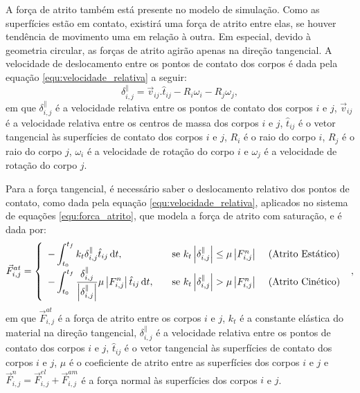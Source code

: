     A força de atrito também está presente no modelo de simulação. Como as superfícies estão em contato, existirá uma força de atrito entre elas, se houver tendência de movimento uma em relação à outra. Em especial, devido à geometria circular, as forças de atrito agirão apenas na direção tangencial. A velocidade de deslocamento entre os pontos de contato dos corpos é dada pela equação \ref{equ:velocidade_relativa} a seguir:
\begin{equation}
  \label{equ:velocidade_relativa}
  \delta_{i,j}^{\parallel} = \vec{v}_{ij}.\hat{t}_{ij} - R_{i}\omega_{i} - R_{j}\omega_{j},
\end{equation}
em que $\delta_{i,j}^{\parallel}$ é a velocidade relativa entre os pontos de contato dos corpos $i$ e $j$, $\vec{v}_{ij}$ é a velocidade relativa entre os centros de massa dos corpos $i$ e $j$, $\hat{t}_{ij}$ é o vetor tangencial às superfícies de contato dos corpos $i$ e $j$, $R_{i}$ é o raio do corpo $i$, $R_{j}$ é o raio do corpo $j$, $\omega_{i}$ é a velocidade de rotação do corpo $i$ e $\omega_{j}$ é a velocidade de rotação do corpo $j$.

    Para a força tangencial, é necessário saber o deslocamento relativo dos pontos de contato, como dada pela equação \ref{equ:velocidade_relativa}, aplicados no sistema de equações \ref{equ:forca_atrito}, que modela a força de atrito com saturação, e é dada por:
\begin{equation}
    \label{equ:forca_atrito}
    \vec{F}_{i,j}^{at} = \left\{
    \begin{array}{l l l}
        \displaystyle -\int_{t_{0}}^{t_{f}} k_{t} \delta_{i,j}^{\parallel} \hat{t}_{ij}\, \mathrm{d} t, & \quad \textrm{se } k_{t} \left| \delta_{i,j}^{\parallel} \right| \leq \mu \left|F_{i,j}^{n}\right| & \textrm{ (Atrito Estático)} \\
        \displaystyle -\int_{t_{0}}^{t_{f}} \frac{\delta_{i,j}^{\parallel}}{\left|\delta_{i,j}^{\parallel}\right|} \mu \left| F_{i,j}^{n} \right| \hat{t}_{ij}\, \mathrm{d} t, & \quad \textrm{se } k_{t} \left| \delta_{i,j}^{\parallel} \right| > \mu \left| F_{i,j}^{n} \right| & \textrm{ (Atrito Cinético)}
    \end{array}
    \right.\ ,
\end{equation}
em que $\vec{F}_{i,j}^{at}$ é a força de atrito entre os corpos $i$ e $j$, $k_{t}$ é a constante elástica do material na direção tangencial, $\delta_{i,j}^{\parallel}$ é a velocidade relativa entre os pontos de contato dos corpos $i$ e $j$, $\hat{t}_{ij}$ é o vetor tangencial às superfícies de contato dos corpos $i$ e $j$, $\mu$ é o coeficiente de atrito entre as superfícies dos corpos $i$ e $j$ e $\vec{F}_{i,j}^{n} = \vec{F}_{i,j}^{el} +\vec{F}_{i,j}^{am}$ é a força normal às superfícies dos corpos $i$ e $j$.

